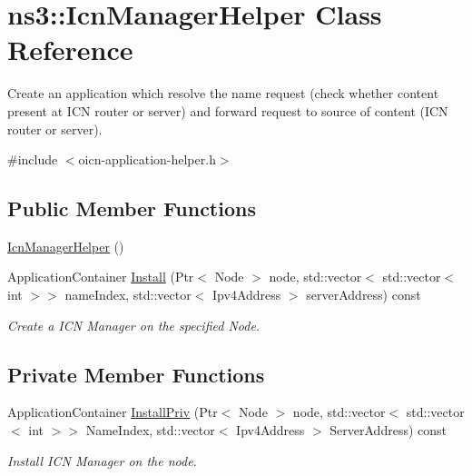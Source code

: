\hypertarget{classns3_1_1IcnManagerHelper}{\section{ns3\-:\-:Icn\-Manager\-Helper Class Reference}
\label{classns3_1_1IcnManagerHelper}
}


Create an application which resolve the name request (check whether content present at I\-C\-N router or server) and forward request to source of content (I\-C\-N router or server).  




{\ttfamily \#include $<$oicn-\/application-\/helper.\-h$>$}

\subsection*{Public Member Functions}
\begin{DoxyCompactItemize}
\item 
\hyperlink{classns3_1_1IcnManagerHelper_aced7f869e1ffd8da9cf65716d541a6eb}{Icn\-Manager\-Helper} ()
\item 
Application\-Container \hyperlink{classns3_1_1IcnManagerHelper_a3f9d4acc58e378899bd8a760821f21eb}{Install} (Ptr$<$ Node $>$ node, std\-::vector$<$ std\-::vector$<$ int $>$$>$ name\-Index, std\-::vector$<$ Ipv4\-Address $>$ server\-Address) const 
\begin{DoxyCompactList}\small\item\em Create a I\-C\-N Manager on the specified Node. \end{DoxyCompactList}\end{DoxyCompactItemize}
\subsection*{Private Member Functions}
\begin{DoxyCompactItemize}
\item 
Application\-Container \hyperlink{classns3_1_1IcnManagerHelper_abecb59da0de92a0424967dbbdf946b07}{Install\-Priv} (Ptr$<$ Node $>$ node, std\-::vector$<$ std\-::vector$<$ int $>$$>$ Name\-Index, std\-::vector$<$ Ipv4\-Address $>$ Server\-Address) const 
\begin{DoxyCompactList}\small\item\em Install I\-C\-N Manager on the node. \end{DoxyCompactList}\end{DoxyCompactItemize}
